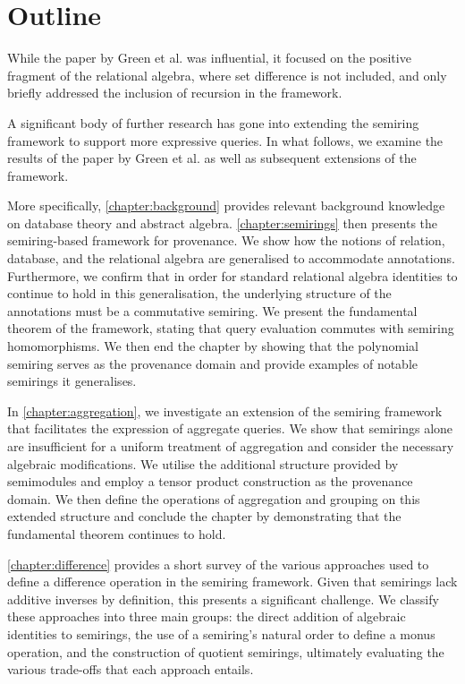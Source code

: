 \documentclass[oneside, 11pt]{amsbook}
\theoremstyle{plain}
\theoremstyle{definition}
\theoremstyle{remark}
\begin{document}
\section{Outline}

While the paper by Green et al. was influential, it focused on the positive fragment of the relational algebra, where set difference is not included, and only briefly addressed the inclusion of recursion in the framework.

A significant body of further research has gone into extending the semiring framework to support more expressive queries. In what follows, we examine the results of the paper by Green et al. as well as subsequent extensions of the framework.

More specifically, \autoref{chapter:background} provides relevant background knowledge on database theory and abstract algebra. \autoref{chapter:semirings} then presents the semiring-based framework for provenance. We show how the notions of relation, database, and the relational algebra are generalised to accommodate annotations. Furthermore, we confirm that in order for standard relational algebra identities to continue to hold in this generalisation, the underlying structure of the annotations must be a commutative semiring. We present the fundamental theorem of the framework, stating that query evaluation commutes with semiring homomorphisms. We then end the chapter by showing that the polynomial semiring serves as the provenance domain and provide examples of notable semirings it generalises.

In \autoref{chapter:aggregation}, we investigate an extension of the semiring framework that facilitates the expression of aggregate queries. We show that semirings alone are insufficient for a uniform treatment of aggregation and consider the necessary algebraic modifications. We utilise the additional structure provided by semimodules and employ a tensor product construction as the provenance domain. We then define the operations of aggregation and grouping on this extended structure and conclude the chapter by demonstrating that the fundamental theorem continues to hold.

\autoref{chapter:difference} provides a short survey of the various approaches used to define a difference operation in the semiring framework. Given that semirings lack additive inverses by definition, this presents a significant challenge. We classify these approaches into three main groups: the direct addition of algebraic identities to semirings, the use of a semiring's natural order to define a monus operation, and the construction of quotient semirings, ultimately evaluating the various trade-offs that each approach entails.
\end{document}
